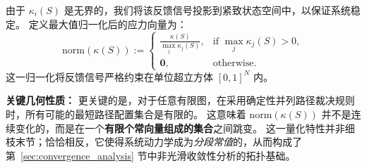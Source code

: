 \documentclass[journal]{IEEEtran}
\theoremstyle{plain}
\theoremstyle{definition}
\begin{document}
由于 $\kappa_i(S)$ 是无界的，我们将该反馈信号投影到紧致状态空间中，以保证系统稳定。
定义最大值归一化后的应力向量为：
\begin{equation}
    \label{eq:bc_normalization}
    \mathrm{norm}(\kappa(S)) :=
    \begin{cases}
    \displaystyle \frac{\kappa(S)}{\max_{j}\kappa_j(S)}, & \text{if } \max_j \kappa_j(S) > 0,\\[6pt]
    \mathbf{0}, & \text{otherwise.}
    \end{cases}
\end{equation}
这一归一化将反馈信号严格约束在单位超立方体 $[0,1]^N$ 内。

\textbf{关键几何性质：}
更关键的是，对于任意有限图，在采用确定性并列路径裁决规则时，所有可能的最短路径配置集合是有限的。
这意味着 $\mathrm{norm}(\kappa(S))$ 并不是连续变化的，而是在一个\textbf{有限个常向量组成的集合}之间跳变。
这一量化特性并非细枝末节；恰恰相反，它使得系统动力学成为\textit{分段常值}的，从而构成了第~\ref{sec:convergence_analysis} 节中非光滑收敛性分析的拓扑基础。
\end{document}
